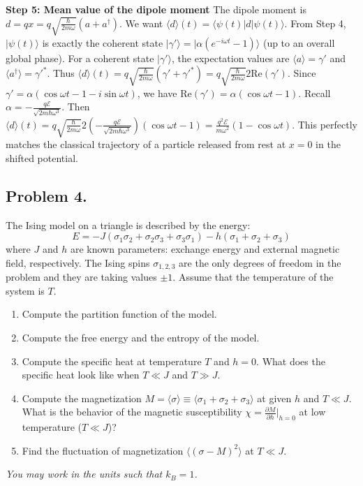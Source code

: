 \begin{solution}
\textbf{Step 5: Mean value of the dipole moment}
The dipole moment is $d = qx = q \sqrt{\frac{\hbar}{2m\omega}} (a + a^\dagger)$.
We want $\langle d \rangle(t) = \langle \psi(t) | d | \psi(t) \rangle$.
From Step 4, $|\psi(t)\rangle$ is exactly the coherent state $|\gamma'\rangle = |\alpha(e^{-i\omega t}-1)\rangle$ (up to an overall global phase).
For a coherent state $|\gamma'\rangle$, the expectation values are $\langle a \rangle = \gamma'$ and $\langle a^\dagger \rangle = \gamma'^*$.
Thus $\langle d \rangle(t) = q \sqrt{\frac{\hbar}{2m\omega}} (\gamma' + \gamma'^*) = q \sqrt{\frac{\hbar}{2m\omega}} 2 \text{Re}(\gamma')$.
Since $\gamma' = \alpha(\cos\omega t - 1 - i\sin\omega t)$, we have $\text{Re}(\gamma') = \alpha(\cos\omega t - 1)$.
Recall $\alpha = -\frac{q\mathcal{E}}{\sqrt{2m\hbar\omega^3}}$.
Then $\langle d \rangle(t) = q \sqrt{\frac{\hbar}{2m\omega}} 2 \left( -\frac{q\mathcal{E}}{\sqrt{2m\hbar\omega^3}} \right) (\cos\omega t - 1) = \frac{q^2\mathcal{E}}{m\omega^2} (1 - \cos\omega t)$.
This perfectly matches the classical trajectory of a particle released from rest at $x=0$ in the shifted potential.
\end{solution}

\subsection*{Problem 4.}

\begin{exercise}
\label{physics:2025:4}
The Ising model on a triangle is described by the energy:
\begin{equation}
    E = - J (\sigma_1 \sigma_2 + \sigma_2 \sigma_3 + \sigma_3 \sigma_1) - h (\sigma_1 + \sigma_2 + \sigma_3) \tag{6}
\end{equation}
where $J$ and $h$ are known parameters: exchange energy and external magnetic field, respectively. The Ising spins $\sigma_{1,2,3}$ are the only degrees of freedom in the problem and they are taking values $\pm 1$. Assume that the temperature of the system is $T$.

\begin{enumerate}
    \item Compute the partition function of the model.
    \item Compute the free energy and the entropy of the model.
    \item Compute the specific heat at temperature $T$ and $h = 0$. What does the specific heat look like when $T \ll J$ and $T \gg J$.
    \item Compute the magnetization $M = \langle \sigma \rangle \equiv \langle \sigma_1 + \sigma_2 + \sigma_3 \rangle$ at given $h$ and $T \ll J$. What is the behavior of the magnetic susceptibility $\chi = \frac{\partial M}{\partial h}|_{h=0}$ at low temperature ($T \ll J$)?
    \item Find the fluctuation of magnetization $\langle (\sigma - M)^2 \rangle$ at $T \ll J$.
\end{enumerate}

\textit{You may work in the units such that $k_B = 1$.}
\end{exercise}

